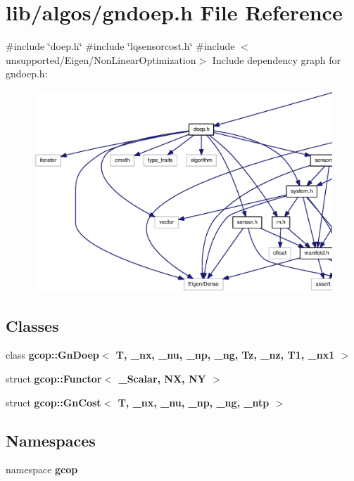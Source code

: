 \section{lib/algos/gndoep.h \-File \-Reference}
\label{gndoep_8h}
{\ttfamily \#include \char`\"{}doep.\-h\char`\"{}}\*
{\ttfamily \#include \char`\"{}lqsensorcost.\-h\char`\"{}}\*
{\ttfamily \#include $<$unsupported/\-Eigen/\-Non\-Linear\-Optimization$>$}\*
\-Include dependency graph for gndoep.\-h\-:\nopagebreak
\begin{figure}[H]
\begin{center}
\leavevmode
\includegraphics[width=350pt]{gndoep_8h__incl}
\end{center}
\end{figure}
\subsection*{\-Classes}
\begin{DoxyCompactItemize}
\item 
class {\bf gcop\-::\-Gn\-Doep$<$ T, \-\_\-nx, \-\_\-nu, \-\_\-np, \-\_\-ng, Tz, \-\_\-nz, T1, \-\_\-nx1 $>$}
\item 
struct {\bf gcop\-::\-Functor$<$ \-\_\-\-Scalar, N\-X, N\-Y $>$}
\item 
struct {\bf gcop\-::\-Gn\-Cost$<$ T, \-\_\-nx, \-\_\-nu, \-\_\-np, \-\_\-ng, \-\_\-ntp $>$}
\end{DoxyCompactItemize}
\subsection*{\-Namespaces}
\begin{DoxyCompactItemize}
\item 
namespace {\bf gcop}
\end{DoxyCompactItemize}
